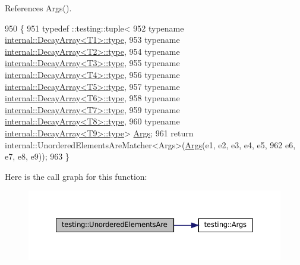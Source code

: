 References Args().


\begin{DoxyCode}
950                                                                           \{
951   typedef ::testing::tuple<
952       \textcolor{keyword}{typename} \hyperlink{namespacegenerate__debs_a50bc9a7ecac9584553e089a448bcde58}{internal::DecayArray<T1>::type},
953       \textcolor{keyword}{typename} \hyperlink{namespacegenerate__debs_a50bc9a7ecac9584553e089a448bcde58}{internal::DecayArray<T2>::type},
954       \textcolor{keyword}{typename} \hyperlink{namespacegenerate__debs_a50bc9a7ecac9584553e089a448bcde58}{internal::DecayArray<T3>::type},
955       \textcolor{keyword}{typename} \hyperlink{namespacegenerate__debs_a50bc9a7ecac9584553e089a448bcde58}{internal::DecayArray<T4>::type},
956       \textcolor{keyword}{typename} \hyperlink{namespacegenerate__debs_a50bc9a7ecac9584553e089a448bcde58}{internal::DecayArray<T5>::type},
957       \textcolor{keyword}{typename} \hyperlink{namespacegenerate__debs_a50bc9a7ecac9584553e089a448bcde58}{internal::DecayArray<T6>::type},
958       \textcolor{keyword}{typename} \hyperlink{namespacegenerate__debs_a50bc9a7ecac9584553e089a448bcde58}{internal::DecayArray<T7>::type},
959       \textcolor{keyword}{typename} \hyperlink{namespacegenerate__debs_a50bc9a7ecac9584553e089a448bcde58}{internal::DecayArray<T8>::type},
960       \textcolor{keyword}{typename} \hyperlink{namespacegenerate__debs_a50bc9a7ecac9584553e089a448bcde58}{internal::DecayArray<T9>::type}> 
      \hyperlink{namespacetesting_a09ac462e8d6ed468cbfaa9c767aee0aa}{Args};
961   \textcolor{keywordflow}{return} internal::UnorderedElementsAreMatcher<Args>(\hyperlink{namespacetesting_a09ac462e8d6ed468cbfaa9c767aee0aa}{Args}(e1, e2, e3, e4, e5,
962       e6, e7, e8, e9));
963 \}
\end{DoxyCode}
Here is the call graph for this function\+:
\nopagebreak
\begin{figure}[H]
\begin{center}
\leavevmode
\includegraphics[width=350pt]{namespacetesting_a2e03e363e193ef512bf9fa964c484375_cgraph}
\end{center}
\end{figure}
\mbox{\label{namespacetesting_ae0e6c9754b17623a64358da8d38c4d13}} 
